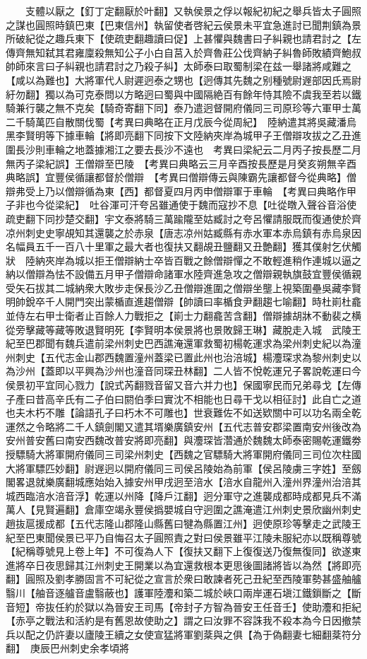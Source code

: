 　　支體以厭之【釘丁定翻厭於叶翻】又執侯景之俘以報紀初紀之舉兵皆太子圓照之謀也圓照時鎮巴東【巴東信州】執留使者啓紀云侯景未平宜急進討已聞荆鎮為景所破紀從之趣兵東下【使疏吏翻趣讀曰促】上甚懼與魏書曰子糾親也請君討之【左傳齊無知弑其君雍廩殺無知公子小白自莒入於齊魯莊公伐齊納子糾魯師敗績齊鮑叔帥師來言曰子糾親也請君討之乃殺子糾】太師泰曰取蜀制梁在兹一舉諸將咸難之【咸以為難也】大將軍代人尉遲迥泰之甥也【迥傳其先魏之别種號尉遟部因氏焉尉紆勿翻】獨以為可克泰問以方略迥曰蜀與中國隔絶百有餘年恃其險不虞我至若以鐵騎兼行襲之無不克矣【騎奇寄翻下同】泰乃遣迥督開府儀同三司原珍等六軍甲士萬二千騎萬匹自散關伐蜀【考異曰典略在正月戊辰今從周紀】　陸納遣其將吳藏潘烏黑李賢明等下據車輪【將即亮翻下同按下文陸納夾岸為城甲子王僧辯攻拔之乙丑進圍長沙則車輪之地蓋據湘江之要去長沙不遠也　考異曰梁紀云二月丙子按長歷二月無丙子梁紀誤】王僧辯至巴陵　【考異曰典略云三月辛酉按長歷是月癸亥朔無辛酉典略誤】宜豐侯循讓都督於僧辯　【考異曰僧辯傳云與陳霸先讓都督今從典略】僧辯弗受上乃以僧辯循為東【西】都督夏四月丙申僧辯軍于車輪　【考異曰典略作甲子非也今從梁紀】　吐谷渾可汗夸呂雖通使于魏而寇抄不息【吐從暾入聲谷音浴使疏吏翻下同抄楚交翻】宇文泰將騎三萬踰隴至姑臧討之夸呂懼請服既而復通使於齊凉州刺史史寧覘知其還襲之於赤泉【唐志凉州姑臧縣有赤水軍本赤烏鎮有赤烏泉因名幅員五千一百八十里軍之最大者也復扶又翻覘丑鹽翻又丑艶翻】獲其僕射乞伏觸狀　陸納夾岸為城以拒王僧辯納士卒皆百戰之餘僧辯憚之不敢輕進稍作連城以逼之納以僧辯為怯不設備五月甲子僧辯命諸軍水陸齊進急攻之僧辯親執旗鼓宜豐侯循親受矢石拔其二城納衆大敗步走保長沙乙丑僧辯進圍之僧辯坐壟上視築圍壘吳藏李賢明帥銳卒千人開門突出蒙楯直進趨僧辯【帥讀曰率楯食尹翻趨七喻翻】時杜崱杜龕並侍左右甲士衛者止百餘人力戰拒之【崱士力翻龕苦含翻】僧辯據胡牀不動裴之横從旁擊藏等藏等敗退賢明死【李賢明本侯景將也景敗歸王琳】藏脫走入城　武陵王紀至巴郡聞有魏兵遣前梁州刺史巴西譙淹還軍救蜀初楊乾運求為梁州刺史紀以為潼州刺史【五代志金山郡西魏置潼州蓋梁已置此州也治涪城】楊灋琛求為黎州刺史以為沙州【蓋即以平興為沙州也潼音同琛丑林翻】二人皆不悅乾運兄子畧說乾運曰今侯景初平宜同心戮力【說式芮翻戮音留又音六并力也】保國寧民而兄弟尋戈【左傳子產曰昔高辛氏有二子伯曰閼伯季曰實沈不相能也日尋干戈以相征討】此自亡之道也夫木朽不雕【論語孔子曰朽木不可雕也】世衰難佐不如送欵關中可以功名兩全乾運然之令略將二千人鎮劍閣又遣其壻樂廣鎮安州【五代志普安郡梁置南安州後改為安州普安舊曰南安西魏改普安將即亮翻】與灋琛皆濳通於魏魏太師泰密賜乾運鐵劵授驃騎大將軍開府儀同三司梁州刺史【西魏之官驃騎大將軍開府儀同三司位次柱國大將軍驃匹妙翻】尉遟迥以開府儀同三司侯呂陵始為前軍【侯呂陵虜三字姓】至劔閣畧退就樂廣翻城應始始入據安州甲戌迥至涪水【涪水自龍州入潼州界潼州治涪其城西臨涪水涪音浮】乾運以州降【降戶江翻】迥分軍守之進襲成都時成都見兵不滿萬人【見賢遍翻】倉庫空竭永豐侯撝嬰城自守迥圍之譙淹遣江州刺史景欣幽州刺史趙抜扈援成都【五代志隆山郡隆山縣舊曰犍為縣置江州】迥使原珍等擊走之武陵王紀至巴東聞侯景已平乃自悔召太子圓照責之對曰侯景雖平江陵未服紀亦以既稱尊號【紀稱尊號見上卷上年】不可復為人下【復扶又翻下上復復送乃復無復同】欲遂東進將卒日夜思歸其江州刺史王開業以為宜還救根本更思後圖諸將皆以為然【將即亮翻】圓照及劉孝勝固言不可紀從之宣言於衆曰敢諫者死己丑紀至西陵軍勢甚盛舳艫翳川【舳音逐艫音盧翳蔽也】護軍陸灋和築二城於峽口兩岸運石塡江鐵鎻斷之【斷音短】帝抜任約於獄以為晉安王司馬【帝封子方智為晉安王任音壬】使助灋和拒紀【赤亭之戰法和活約是有舊恩故使助之】謂之曰汝罪不容誅我不殺本為今日因撤禁兵以配之仍許妻以廬陵王續之女使宣猛將軍劉棻與之俱【為于偽翻妻七細翻棻符分翻】　庚辰巴州刺史余孝頃將